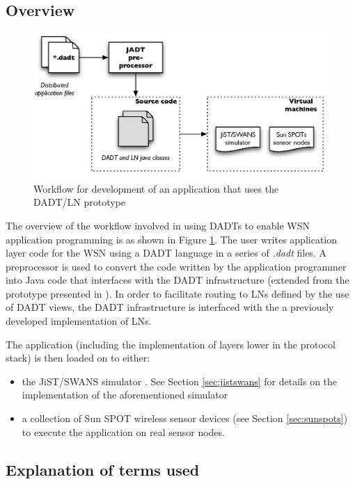 \subsection{Overview}
\begin{figure}
\centering
\label{Fig:DADTLN_architecture}
\includegraphics[scale=0.71]{img/DADTLN_architecture.eps} \caption[DADT/LN
application workflow]{Workflow for development of an application that uses
the DADT/LN prototype}
\end{figure} 
The overview of the workflow involved in using DADTs to enable WSN application
programming is as shown in Figure \ref{Fig:DADTLN_architecture}. The user writes
application layer code for the WSN using a DADT language in a series of
\emph{.dadt} files. A preprocessor is used to convert the code written by the
application programmer into Java code that interfaces with the DADT
infrastructure (extended from the prototype presented in
\cite{migliavacca_DADT:2006}). In order to facilitate routing to LNs defined by
the use of DADT views, the DADT infrastructure is interfaced with the a
previously developed implementation of LNs. 

The application (including the implementation of layers lower in the protocol
stack) is then loaded on to either:
\begin{itemize}
\item the JiST/SWANS simulator \cite{barr_JIST:2005, barr_SWANS}. See Section \ref{sec:jistswans} for details on the implementation of
the aforementioned simulator
\item a collection of Sun SPOT wireless sensor devices \cite{simon_squawk:2006}
(see Section \ref{sec:sunspots}) to execute the application on real sensor nodes.
\end{itemize}

\subsection{Explanation of terms used}

